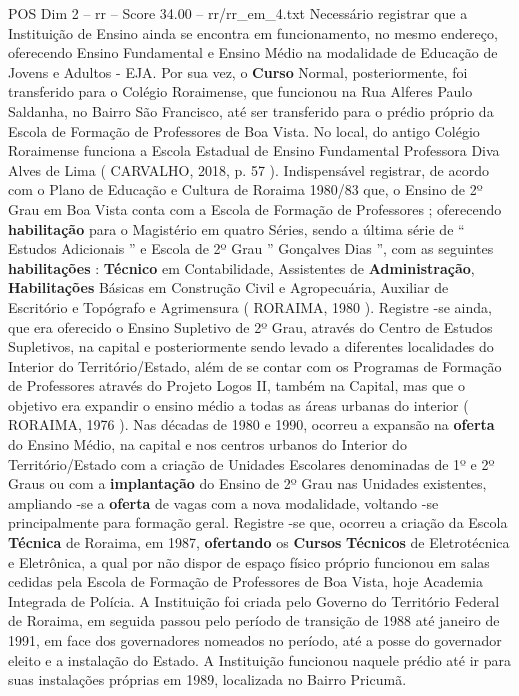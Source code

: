 \begin{textsample}{POS Dim 2 – rr – Score 34.00 – rr/rr\_em\_4.txt}
Necessário registrar que a Instituição de Ensino ainda se encontra em funcionamento, no mesmo endereço, oferecendo Ensino Fundamental e Ensino Médio na modalidade de Educação de Jovens e Adultos - EJA.
Por sua vez, o \textbf{Curso} Normal, posteriormente, foi transferido para o Colégio Roraimense, que funcionou na Rua Alferes Paulo Saldanha, no Bairro São Francisco, até ser transferido para o prédio próprio da Escola de Formação de Professores de Boa Vista.
No local, do antigo Colégio Roraimense funciona a Escola Estadual de Ensino Fundamental Professora Diva Alves de Lima ( CARVALHO, 2018, p. 57 ).
Indispensável registrar, de acordo com o Plano de Educação e Cultura de Roraima 1980/83 que, o Ensino de 2º Grau em Boa Vista conta com a Escola de Formação de Professores ; oferecendo \textbf{habilitação} para o Magistério em quatro Séries, sendo a última série de “ Estudos Adicionais ” e Escola de 2º Grau ” Gonçalves Dias ”, com as seguintes \textbf{habilitações} : \textbf{Técnico} em Contabilidade, Assistentes de \textbf{Administração}, \textbf{Habilitações} Básicas em Construção Civil e Agropecuária, Auxiliar de Escritório e Topógrafo e Agrimensura ( RORAIMA, 1980 ).
Registre -se ainda, que era oferecido o Ensino Supletivo de 2º Grau, através do Centro de Estudos Supletivos, na capital e posteriormente sendo levado a diferentes localidades do Interior do Território/Estado, além de se contar com os Programas de Formação de Professores através do Projeto Logos II, também na Capital, mas que o objetivo era expandir o ensino médio a todas as áreas urbanas do interior ( RORAIMA, 1976 ).
Nas décadas de 1980 e 1990, ocorreu a expansão na \textbf{oferta} do Ensino Médio, na capital e nos centros urbanos do Interior do Território/Estado com a criação de Unidades Escolares denominadas de 1º e 2º Graus ou com a \textbf{implantação} do Ensino de 2º Grau nas Unidades existentes, ampliando -se a \textbf{oferta} de vagas com a nova modalidade, voltando -se principalmente para formação geral.
Registre -se que, ocorreu a criação da Escola \textbf{Técnica} de Roraima, em 1987, \textbf{ofertando} os \textbf{Cursos} \textbf{Técnicos} de Eletrotécnica e Eletrônica, a qual por não dispor de espaço físico próprio funcionou em salas cedidas pela Escola de Formação de Professores de Boa Vista, hoje Academia Integrada de Polícia.
A Instituição foi criada pelo Governo do Território Federal de Roraima, em seguida passou pelo período de transição de 1988 até janeiro de 1991, em face dos governadores nomeados no período, até a posse do governador eleito e a instalação do Estado.
A Instituição funcionou naquele prédio até ir para suas instalações próprias em 1989, localizada no Bairro Pricumã.

\end{textsample}
